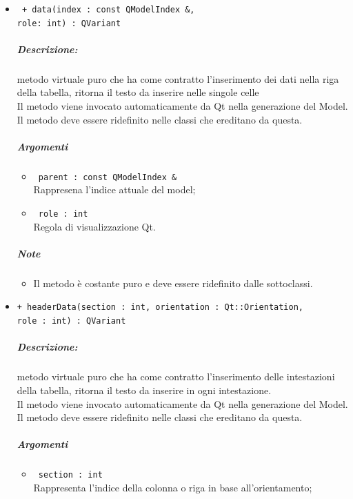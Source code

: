 \begin{itemize}
	\item \color{blue}\verb! + data(index : const QModelIndex &, !\\
					\verb!role: int) : QVariant!\\
	\color{black}
	\subparagraph{Descrizione:} metodo virtuale puro che ha come contratto l'inserimento dei dati nella riga della tabella, ritorna il testo da inserire nelle singole celle\\
		Il metodo viene invocato automaticamente da Qt\g{} nella generazione del Model.\\
		Il metodo deve essere ridefinito nelle classi che ereditano da questa.\\
	\subparagraph{Argomenti}
		\begin{itemize}
			\item \color{RoyalPurple}\verb! parent : const QModelIndex &!\\
			\color{black}Rappresena l'indice attuale del model;
			
			\item \color{RoyalPurple}\verb! role : int!\\
			\color{black}Regola di visualizzazione Qt\g{}.
		\end{itemize}
	\subparagraph{Note}
			\begin{itemize}
				\item Il metodo è costante puro e deve essere ridefinito dalle sottoclassi.
			\end{itemize}
		
	\item \color{blue}\verb!+ headerData(section : int, orientation : Qt::Orientation,!\\
	  \verb!role : int) : QVariant!\\
	\color{black}
	\subparagraph{Descrizione:} metodo virtuale puro che ha come contratto l'inserimento delle intestazioni della tabella, ritorna il testo da inserire in ogni intestazione.\\
	Il metodo viene invocato automaticamente da Qt\g{} nella generazione del Model.\\
	Il metodo deve essere ridefinito nelle classi che ereditano da questa.\\
	\subparagraph{Argomenti}
		\begin{itemize}
			\item \color{RoyalPurple}\verb! section : int!\\
			\color{black}Rappresenta l'indice della colonna o riga in base all'orientamento;
			

\end{itemize}
\end{itemize}
